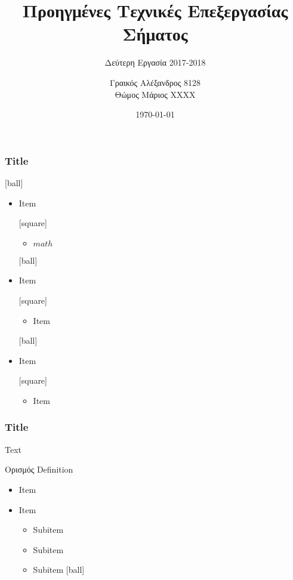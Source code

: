 \documentclass{beamer}
\title[Προηγμένες Τεχνικές Επεξεργασίας Σήματος]{Προηγμένες Τεχνικές Επεξεργασίας Σήματος}
\subtitle{Δεύτερη Εργασία 2017-2018}
\author[Γραικός Α., Θώμος Μ.]{Γραικός Αλέξανδρος 8128 \\ Θώμος Μάριος ΧΧΧΧ}
\date[\todayshort]{\today}
\begin{document}
 
\frame{\titlepage}
 
\begin{frame}
\frametitle{Title}

[ball]
\begin{itemize}
\item Item

[square]
\begin{itemize}
\item $math$
\end{itemize}

[ball]
\item Item

[square]
\begin{itemize}
\item Item
\end{itemize}

[ball]
\item Item

[square]
\begin{itemize}
\item Item
\end{itemize}
\end{itemize}

\end{frame}

\begin{frame}
\frametitle{Title}
Text

\begin{block}{Ορισμός}
Definition
\end{block}

\begin{itemize}
\item Item
\item Item
	\begin{itemize}
	[square]
	\item Subitem
	\item Subitem
	\item Subitem
	[ball]
	\end{itemize}
\end{itemize}

\end{frame}
\end{document}
